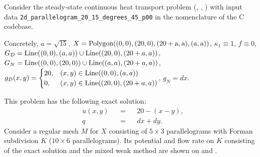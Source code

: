 \begin{example}
  \label{cmc/diffusion/continuous/steady_state/examples/2d_parallelogram_20_15_degrees_45_p00-example}
  Consider the steady-state continuous heat transport problem
  (,
   ,
   )
  with input data \verb|2d_parallelogram_20_15_degrees_45_p00| in the nomenclature of the C codebase.

  Concretely,
    $a = \sqrt{15}$,
    $X = {\rm Polygon((0, 0), (20, 0), (20 + a, a), (a, a))}$,
    $\kappa_1 \equiv 1$,
    $f \equiv 0$,
    $G_D = {\rm Line}((0, 0), (a, a)) \cup {\rm Line}((20, 0), (20 + a, a))$,
    $G_N = {\rm Line}((0, 0), (20, 0)) \cup {\rm Line}((a, a), (20 + a, a))$,
    $g_D(x, y) =
      \begin{cases}
        20, & (x, y) \in {\rm Line}((0, 0), (a, a)) \\
        0,  & (x, y) \in {\rm Line}((20, 0), (20 + a, a))
      \end{cases}
    $,
    $g_N = d x$.

  This problem has the following exact solution:
  \begin{subequations}
    \begin{alignat}{3}
      & u(x, y) && = && 20 - (x - y), \\
      & q && = && d x + d y.
    \end{alignat}
  \end{subequations}
  Consider a regular mesh $M$ for $X$ consisting of $5 \times 3$ parallelograms
  with Forman subdivision $K$ ($10 \times 6$ parallelograms).
  Its potential and flow rate on $K$ consisting of the exact solution and the
  mixed weak method are shown on
  and
  .
\end{example}
